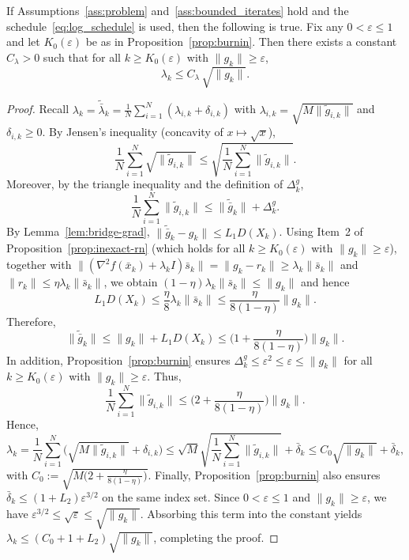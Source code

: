 \documentclass[review,onefignum,onetabnum]{siamart171218}
\begin{document}
	\begin{lemma}\label{lem:lambda_scaling}
		If Assumptions~\ref{ass:problem} and~\ref{ass:bounded_iterates}
		hold and the schedule~\eqref{eq:log_schedule} is used, then the following is true.
		Fix any $0<\varepsilon\le1$ and let $K_0(\varepsilon)$ be as in Proposition~\ref{prop:burnin}.
		Then there exists a constant $C_\lambda>0$ such that for all $k\ge K_0(\varepsilon)$ with $\|g_k\|\ge \varepsilon$,
		\[
		\lambda_k\le C_\lambda\,\sqrt{\|g_k\|}.
		\]
	\end{lemma}
	\begin{proof}
		Recall $\lambda_k=\tilde{\bar\lambda}_k=\frac1N\sum_{i=1}^N(\lambda_{i,k}+\delta_{i,k})$ with
		$\lambda_{i,k}=\sqrt{M\|\tilde g_{i,k}\|}$ and $\delta_{i,k}\ge 0$.
		By Jensen's inequality (concavity of $x\mapsto\sqrt{x}$),
		\[
		\frac1N\sum_{i=1}^N \sqrt{\|\tilde g_{i,k}\|}
		\le \sqrt{\frac1N\sum_{i=1}^N \|\tilde g_{i,k}\|}.
		\]
		Moreover, by the triangle inequality and the definition of $\Delta_k^g$,
		\[
		\frac1N\sum_{i=1}^N \|\tilde g_{i,k}\|
		\le \|\tilde{\bar g}_k\|+\Delta_k^g.
		\]
		By Lemma~\ref{lem:bridge-grad}, $\|\tilde{\bar g}_k-g_k\|\le L_1D(X_k)$.
		Using Item~2 of Proposition~\ref{prop:inexact-rn} (which holds for all $k\ge K_0(\varepsilon)$ with $\|g_k\|\ge \varepsilon$),
		together with
		$\|(\nabla^2 f(\bar x_k)+\lambda_k I)\bar s_k\|
		=\|g_k-r_k\|\ge \lambda_k\|\bar s_k\|$
		and $\|r_k\|\le \eta\lambda_k\|\bar s_k\|$,
		we obtain $(1-\eta)\lambda_k\|\bar s_k\|\le \|g_k\|$ and hence
		\[
		L_1D(X_k)\le \frac{\eta}{8}\lambda_k\|\bar s_k\|\le \frac{\eta}{8(1-\eta)}\|g_k\|.
		\]
		Therefore,
		\[
		\|\tilde{\bar g}_k\|\le \|g_k\|+L_1D(X_k)\le \Big(1+\frac{\eta}{8(1-\eta)}\Big)\|g_k\|.
		\]
		In addition, Proposition~\ref{prop:burnin} ensures
		$\Delta_k^g\le \varepsilon^2\le \varepsilon\le \|g_k\|$
		for all $k\ge K_0(\varepsilon)$ with $\|g_k\|\ge \varepsilon$.
		Thus,
		\[
		\frac1N\sum_{i=1}^N \|\tilde g_{i,k}\|
		\le \Big(2+\frac{\eta}{8(1-\eta)}\Big)\|g_k\|.
		\]
		Hence,
		\[
		\lambda_k
		= \frac1N\sum_{i=1}^N\big(\sqrt{M\|\tilde g_{i,k}\|}+\delta_{i,k}\big)
		\le \sqrt{M}\sqrt{\frac1N\sum_{i=1}^N \|\tilde g_{i,k}\|}+\bar\delta_k
		\le C_0\sqrt{\|g_k\|}+\bar\delta_k,
		\]
		with $C_0:=\sqrt{M\big(2+\frac{\eta}{8(1-\eta)}\big)}$.
		Finally, Proposition~\ref{prop:burnin} also ensures
		$\bar\delta_k\le (1+L_2)\varepsilon^{3/2}$ on the same index set.
		Since $0<\varepsilon\le1$ and $\|g_k\|\ge\varepsilon$, we have
		$\varepsilon^{3/2}\le \sqrt{\varepsilon}\le \sqrt{\|g_k\|}$.
		Absorbing this term into the constant yields
		$\lambda_k\le (C_0+1+L_2)\sqrt{\|g_k\|}$, completing the proof.
	\end{proof}
	
\end{document}
